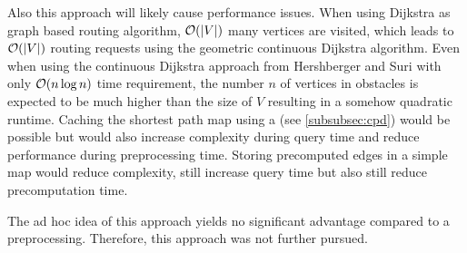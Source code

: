 		Also this approach will likely cause performance issues.
		When using Dijkstra as graph based routing algorithm, $\mathcal{O}(|V|)$ many vertices are visited, which leads to $\mathcal{O}(|V|)$ routing requests using the geometric continuous Dijkstra algorithm.
		Even when using the continuous Dijkstra approach from Hershberger and Suri \cite{hershberger-suri} with only $\mathcal{O}(n \log n)$ time requirement, the number $n$ of vertices in obstacles is expected to be much higher than the size of $V$ resulting in a somehow quadratic runtime.
		Caching the shortest path map using a  (see \cref{subsubsec:cpd}) would be possible but would also increase complexity during query time and reduce performance during preprocessing time.
		Storing precomputed edges in a simple map would reduce complexity, still increase query time but also still reduce precomputation time.
		
		The ad hoc idea of this approach yields no significant advantage compared to a preprocessing.
		Therefore, this approach was not further pursued.
		
		
	
